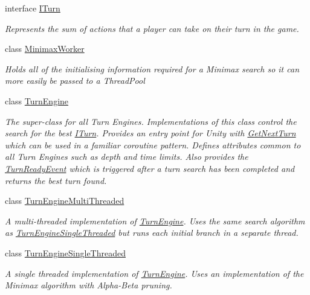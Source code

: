 \begin{DoxyCompactItemize}
interface \hyperlink{interface_universal_turn_based_a_i_1_1_i_turn}{I\+Turn}
\begin{DoxyCompactList}\small\item\em Represents the sum of actions that a player can take on their turn in the game. \end{DoxyCompactList}\item 
class \hyperlink{class_universal_turn_based_a_i_1_1_minimax_worker}{Minimax\+Worker}
\begin{DoxyCompactList}\small\item\em Holds all of the initialising information required for a Minimax search so it can more easily be passed to a Thread\+Pool \end{DoxyCompactList}\item 
class \hyperlink{class_universal_turn_based_a_i_1_1_turn_engine}{Turn\+Engine}
\begin{DoxyCompactList}\small\item\em The super-\/class for all Turn Engines. Implementations of this class control the search for the best \hyperlink{interface_universal_turn_based_a_i_1_1_i_turn}{I\+Turn}. Provides an entry point for Unity with \hyperlink{class_universal_turn_based_a_i_1_1_turn_engine_ad1a07e70064e2f188b65a783aa49cd8a}{Get\+Next\+Turn} which can be used in a familiar coroutine pattern. Defines attributes common to all Turn Engines such as depth and time limits. Also provides the \hyperlink{class_universal_turn_based_a_i_1_1_turn_engine_af10115494121382d2966a8fc9fe4c9a0}{Turn\+Ready\+Event} which is triggered after a turn search has been completed and returns the best turn found. \end{DoxyCompactList}\item 
class \hyperlink{class_universal_turn_based_a_i_1_1_turn_engine_multi_threaded}{Turn\+Engine\+Multi\+Threaded}
\begin{DoxyCompactList}\small\item\em A multi-\/threaded implementation of \hyperlink{class_universal_turn_based_a_i_1_1_turn_engine}{Turn\+Engine}. Uses the same search algorithm as \hyperlink{class_universal_turn_based_a_i_1_1_turn_engine_single_threaded}{Turn\+Engine\+Single\+Threaded} but runs each initial branch in a separate thread. \end{DoxyCompactList}\item 
class \hyperlink{class_universal_turn_based_a_i_1_1_turn_engine_single_threaded}{Turn\+Engine\+Single\+Threaded}
\begin{DoxyCompactList}\small\item\em A single threaded implementation of \hyperlink{class_universal_turn_based_a_i_1_1_turn_engine}{Turn\+Engine}. Uses an implementation of the Minimax algorithm with Alpha-\/\+Beta pruning. \end{DoxyCompactList}\end{DoxyCompactItemize}
